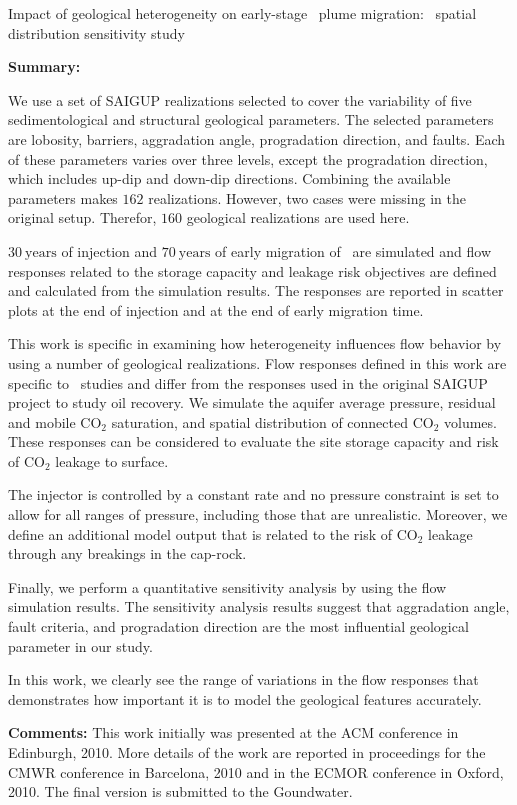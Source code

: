 {Impact of geological heterogeneity on early-stage \coo\ plume migration: \coo\
spatial distribution sensitivity study}
{
\textbf{Summary:}

We use a set of SAIGUP realizations selected to cover the variability of five
sedimentological and structural geological parameters. The selected parameters are
lobosity, barriers, aggradation angle, progradation direction, and faults. Each
of these parameters varies over three levels, except the progradation direction,
which includes up-dip and down-dip directions. Combining the available 
parameters makes $162$ realizations. However, two cases were missing in the original setup. Therefor, $160$ geological realizations are used here.

$30~\mbox{years}$ of injection and $70~\mbox{years}$ of early migration of \coo\ are simulated and flow responses related to the storage
capacity and leakage risk objectives are defined and calculated from
the simulation results. The responses are reported in scatter plots at the end of
injection and at the end of early migration time. 

This work is specific in examining how heterogeneity influences flow behavior
by using a number of geological realizations. Flow responses defined in
this work are specific to \coo\ studies and differ from the responses
used in the original SAIGUP project to study oil recovery. We simulate the
aquifer average pressure, residual and mobile CO$_2$
saturation, and spatial distribution of connected CO$_2$ volumes. These
responses can be considered to evaluate the site storage capacity and risk of
CO$_2$ leakage to surface. 

The injector is controlled by a constant rate and no pressure constraint is set
to allow for all ranges of pressure, including those that are unrealistic.
Moreover, we define an additional model output that is related to the risk of
CO$_2$ leakage through any breakings in the cap-rock.

Finally, we perform a quantitative sensitivity analysis by using the flow simulation results. The sensitivity analysis results suggest that aggradation angle, fault criteria, and progradation direction are the most influential geological parameter in our study.

In this work, we clearly see the range of variations in the flow responses that demonstrates how important it is to model the geological features accurately. 

\vspace{0.5cm}
\noindent\textbf{Comments:}
This work initially was presented at the ACM conference in Edinburgh,  2010. More details of the work are reported in proceedings for the CMWR conference in Barcelona, 2010 and in the ECMOR conference in Oxford, 2010. The final version is submitted to the Goundwater. 

}
